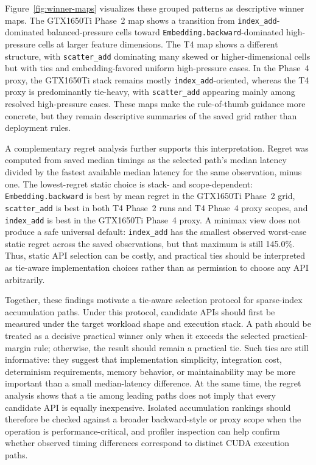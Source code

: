 Figure~\ref{fig:winner-maps} visualizes these grouped patterns as descriptive winner maps. The GTX1650Ti Phase~2 map shows a transition from \texttt{index\_\allowbreak add}-dominated balanced-pressure cells toward \texttt{Embedding.\allowbreak backward}-dominated high-pressure cells at larger feature dimensions. The T4 map shows a different structure, with \texttt{scatter\_\allowbreak add} dominating many skewed or higher-dimensional cells but with ties and embedding-favored uniform high-pressure cases. In the Phase~4 proxy, the GTX1650Ti stack remains mostly \texttt{index\_\allowbreak add}-oriented, whereas the T4 proxy is predominantly tie-heavy, with \texttt{scatter\_\allowbreak add} appearing mainly among resolved high-pressure cases. These maps make the rule-of-thumb guidance more concrete, but they remain descriptive summaries of the saved grid rather than deployment rules.

A complementary regret analysis further supports this interpretation. Regret was computed from saved median timings as the selected path's median latency divided by the fastest available median latency for the same observation, minus one. The lowest-regret static choice is stack- and scope-dependent: \texttt{Embedding.\allowbreak backward} is best by mean regret in the GTX1650Ti Phase~2 grid, \texttt{scatter\_\allowbreak add} is best in both T4 Phase~2 runs and T4 Phase~4 proxy scopes, and \texttt{index\_\allowbreak add} is best in the GTX1650Ti Phase~4 proxy. A minimax view does not produce a safe universal default: \texttt{index\_\allowbreak add} has the smallest observed worst-case static regret across the saved observations, but that maximum is still 145.0\%. Thus, static API selection can be costly, and practical ties should be interpreted as tie-aware implementation choices rather than as permission to choose any API arbitrarily.

Together, these findings motivate a tie-aware selection protocol for sparse-index accumulation paths. Under this protocol, candidate APIs should first be measured under the target workload shape and execution stack. A path should be treated as a decisive practical winner only when it exceeds the selected practical-margin rule; otherwise, the result should remain a practical tie. Such ties are still informative: they suggest that implementation simplicity, integration cost, determinism requirements, memory behavior, or maintainability may be more important than a small median-latency difference. At the same time, the regret analysis shows that a tie among leading paths does not imply that every candidate API is equally inexpensive. Isolated accumulation rankings should therefore be checked against a broader backward-style or proxy scope when the operation is performance-critical, and profiler inspection can help confirm whether observed timing differences correspond to distinct CUDA execution paths.

